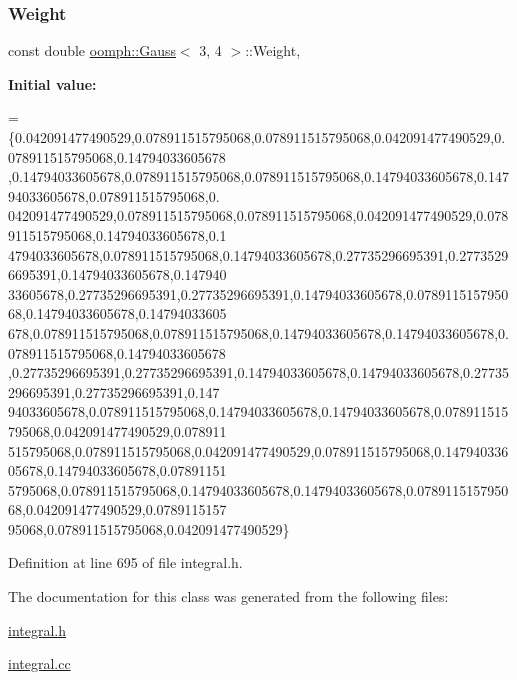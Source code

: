 \mbox{\label{classoomph_1_1Gauss_3_013_00_014_01_4_a47cc0e47ba2d5217fde73a9fa4ccac06}} 
\subsubsection{\texorpdfstring{Weight}{Weight}}
{\footnotesize\ttfamily const double \hyperlink{classoomph_1_1Gauss}{oomph\+::\+Gauss}$<$ 3, 4 $>$\+::Weight\hspace{0.3cm}{\ttfamily [static]}, {\ttfamily [private]}}

{\bfseries Initial value\+:}
\begin{DoxyCode}
= 
\{0.042091477490529,0.078911515795068,0.078911515795068,0.042091477490529,0.078911515795068,0.14794033605678
      ,0.14794033605678,0.078911515795068,0.078911515795068,0.14794033605678,0.14794033605678,0.078911515795068,0.
      042091477490529,0.078911515795068,0.078911515795068,0.042091477490529,0.078911515795068,0.14794033605678,0.1
      4794033605678,0.078911515795068,0.14794033605678,0.27735296695391,0.27735296695391,0.14794033605678,0.147940
      33605678,0.27735296695391,0.27735296695391,0.14794033605678,0.078911515795068,0.14794033605678,0.14794033605
      678,0.078911515795068,0.078911515795068,0.14794033605678,0.14794033605678,0.078911515795068,0.14794033605678
      ,0.27735296695391,0.27735296695391,0.14794033605678,0.14794033605678,0.27735296695391,0.27735296695391,0.147
      94033605678,0.078911515795068,0.14794033605678,0.14794033605678,0.078911515795068,0.042091477490529,0.078911
      515795068,0.078911515795068,0.042091477490529,0.078911515795068,0.14794033605678,0.14794033605678,0.07891151
      5795068,0.078911515795068,0.14794033605678,0.14794033605678,0.078911515795068,0.042091477490529,0.0789115157
      95068,0.078911515795068,0.042091477490529\}
\end{DoxyCode}


Definition at line 695 of file integral.\+h.



The documentation for this class was generated from the following files\+:\begin{DoxyCompactItemize}
\item 
\hyperlink{integral_8h}{integral.\+h}\item 
\hyperlink{integral_8cc}{integral.\+cc}\end{DoxyCompactItemize}
